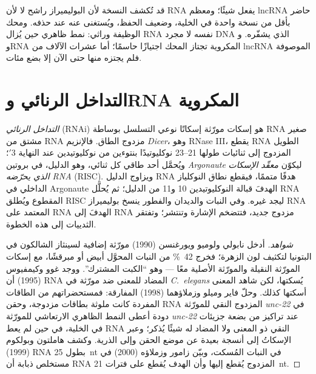 \begin{remark}\label{rem:b3:rna-regulation:function}
قد تُكشف النسخة لأن البوليميراز راشح لا لأن RNA يفعل شيئًا؛ ومعظم
lncRNA حاضر بأقل من نسخة واحدة في الخلية، وضعيف الحفظ، ويُستغنى عنه
عند حذفه. ومحك الوظيفة وراثي: نمط ظاهري حين يُزال RNA نفسه لا مجرد
DNA الذي يشفّره. و\emph{} وRNA المكروية  تجتاز المحك اجتيازًا
حاسمًا؛ أما عشرات الآلاف من lncRNA الموصوفة فلم يجتزه منها حتى الآن
إلا بضع مئات.
\end{remark}

\section{التداخل الرنائي وRNA المكروية}

\begin{definition}\label{def:b3:rna-regulation:rnai}
\emph{التداخل الرنائي} (RNAi) هو إسكات مورّثة إسكاتًا نوعي التسلسل
بوساطة RNA صغير مشتق من RNA مزدوج الطاق. فالإنزيم \emph{Dicer}، وهو
RNase III، يقطع RNA الطويل المزدوج إلى ثنائيات طولها
\numrange{21}{23} نوكليوتيدًا بنتوءين من نوكليوتيدين عند النهاية 3$'$؛
ويُحمَّل أحد طاقي كل ثنائي، وهو الدليل، في بروتين \emph{Argonaute}
ليكوّن \emph{معقّد الإسكات الذي يحرّضه RNA} (RISC). ويزاوج الدليل RNA
هدفًا متممًا، فيقطع نطاق النوكلياز الداخلي في Argonaute الهدفَ قبالة
النوكليوتيدين 10 و11 من الدليل؛ ثم يُحلَّل RNA المقطوع ويُطلق RISC
ليجد غيره. وفي النبات والديدان والفطور ينسخ بوليميراز RNA المعتمد على
RNA الهدفَ إلى RNA مزدوج جديد، فتتضخم الإشارة وتنتشر؛ وتفتقر الثدييات
إلى هذه الخطوة.
\end{definition}

\begin{proof}[شواهد]
أدخل نابولي ولوميو ويورغنسن (1990) مورّثة إضافية لسينثاز الشالكون في
البتونيا لتكثيف لون الزهرة؛ فخرج \qty{42}{\%} من النبات المحوَّل أبيض
أو مبرقشًا، مع إسكات المورّثة النقيلة والمورّثة الأصلية معًا --- وهو
``الكبت المشترك''. ووجد غوو وكيمفيوس (1995) أن RNA المضاد للمعنى ضد
مورّثة في \emph{C.~elegans} يُسكتها، لكن شاهد المعنى أسكتها كذلك. وحلّ
فاير وميلو وزملاؤهما (1998) المفارقة: فمستحضراتهم من الطاقات المفردة
كانت ملوثة بطاقات مزدوجة، وحقن RNA المزدوج النقي للمورّثة \emph{unc-22} في
دودة أعطى النمط الظاهري الارتعاشي للمورّثة \emph{unc-22} عند تراكيز من بضعة
جزيئات في الخلية، في حين لم يعط RNA النقي ذو المعنى ولا المضاد له شيئًا
يُذكر؛ وعبر الإسكاتُ إلى أنسجة بعيدة عن موضع الحقن وإلى الذرية. وكشف
هاملتون وبولكوم (1999) RNA بطول \qty{25}{nt} في النبات المُسكت، وبيّن
زامور وزملاؤه (2000) في مستخلص ذبابة أن RNA المزدوج يُقطع إليها وأن
الهدف يُقطع على فترات \qty{21}{nt}.
\end{proof}

